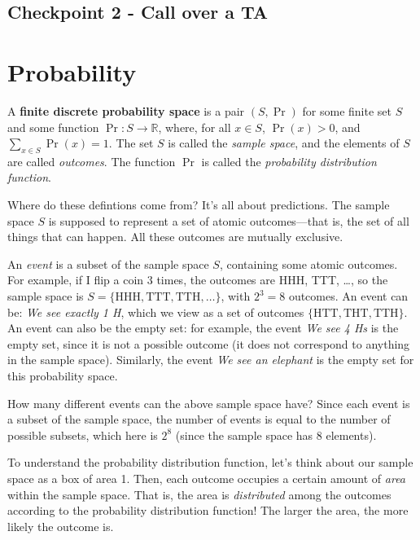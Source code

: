 \documentclass[12pt,letterpaper]{article}
\begin{document}
\subsection*{Checkpoint 2 - Call over a TA}

\newpage
\section*{Probability}

A \textbf{finite discrete probability space} is a pair $(S,\Pr)$ for some finite set $S$ and some function $\Pr:S\rightarrow \mathbb{R}$, where, for all $x \in S$, $\Pr(x)>0$, and $\sum_{x\in S}\Pr(x)=1$. The set $S$ is called the \textit{sample space}, and the elements of $S$ are called \emph{outcomes}. The function $\Pr$ is called the \textit{probability distribution function}. 

Where do these defintions come from? It's all about predictions. The sample space $S$ is supposed to represent a set of atomic outcomes---that is, the set of all things that can happen. All these outcomes are mutually exclusive.

An \textit{event} is a subset of the sample space $S$, containing some atomic outcomes. For example, if I flip a coin 3 times, the outcomes are HHH, TTT, \dots, so the sample space is $S=\{ \text{HHH}, \text{TTT}, \text{TTH}, \dots \}$, with $2^3=8$ outcomes. An event can be: \textit{We see exactly 1 H}, which we view as a set of outcomes $\{\text{HTT}, \text{THT}, \text{TTH}\}$. An event can also be the empty set: for example, the event \textit{We see 4 Hs} is the empty set, since it is not a possible outcome (it does not correspond to anything in the sample space). Similarly, the event \textit{We see an elephant} is the empty set for this probability space.

How many different events can the above sample space have? Since each event is a subset of the sample space, the number of events is equal to the number of possible subsets, which here is $2^8$ (since the sample space has 8 elements).

To understand the probability distribution function, let's think about our sample space as a box of area 1. Then, each outcome occupies a certain amount of \textit{area} within the sample space. That is, the area is \textit{distributed} among the outcomes according to the probability distribution function! The larger the area, the more likely the outcome is.
\end{document}
